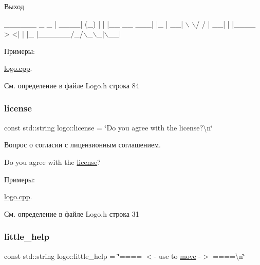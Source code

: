 Выход 
\begin{DoxyCode}
 \_\_\_\_\_\_      \_ \_   
|  \_\_\_\_|    (\_) |  
| |\_\_  \_\_  \_\_\_| |\_ 
|  \_\_| \(\backslash\) \(\backslash\)/ / | \_\_|
| |\_\_\_\_ >  <| | |\_ 
|\_\_\_\_\_\_/\_/\(\backslash\)\_\(\backslash\)\_|\(\backslash\)\_\_|
\end{DoxyCode}
 \begin{Desc}
\item[Примеры\+: ]\par
\hyperlink{logo_8cpp-example}{logo.\+cpp}.\end{Desc}


См. определение в файле Logo.\+h строка 84

\mbox{\label{namespacelogo_ae5491adc000fde7d3d8229372c877da2}} 
\subsubsection{\texorpdfstring{license}{license}}
{\footnotesize\ttfamily const std\+::string logo\+::license = \char`\"{}Do you agree with the license?\textbackslash{}n\char`\"{}}

Вопрос о согласии с лицензионным соглашением. 
\begin{DoxyCode}
Do you agree with the \hyperlink{namespacelogo_ae5491adc000fde7d3d8229372c877da2}{license}?
\end{DoxyCode}
 \begin{Desc}
\item[Примеры\+: ]\par
\hyperlink{logo_8cpp-example}{logo.\+cpp}.\end{Desc}


См. определение в файле Logo.\+h строка 31

\mbox{\label{namespacelogo_adf18ab31906b644891fc8311df747a9d}} 
\subsubsection{\texorpdfstring{little\+\_\+help}{little\_help}}
{\footnotesize\ttfamily const std\+::string logo\+::little\+\_\+help = \char`\"{}==== $<$-\/ use to \hyperlink{namespacelogo_a03b6b80b5648e7dbbbf00b258df733b6}{move} -\/$>$ ====\textbackslash{}n\char`\"{}}


